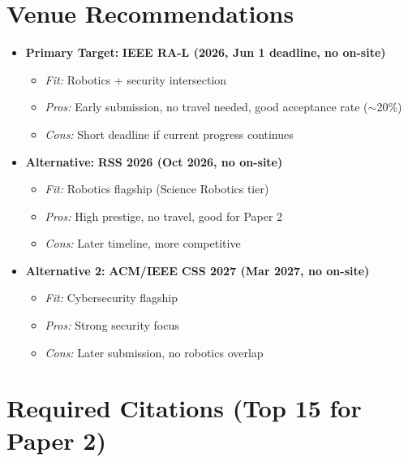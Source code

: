 \documentclass[conference]{IEEEtran}
\begin{document}
\section{Venue Recommendations}

\begin{itemize}
    \item \textbf{Primary Target:} \textbf{IEEE RA-L (2026, Jun 1 deadline, no on-site)}
    \begin{itemize}
        \item \textit{Fit:} Robotics + security intersection
        \item \textit{Pros:} Early submission, no travel needed, good acceptance rate ($\sim$20\%)
        \item \textit{Cons:} Short deadline if current progress continues
    \end{itemize}
    
    \item \textbf{Alternative:} \textbf{RSS 2026 (Oct 2026, no on-site)}
    \begin{itemize}
        \item \textit{Fit:} Robotics flagship (Science Robotics tier)
        \item \textit{Pros:} High prestige, no travel, good for Paper 2
        \item \textit{Cons:} Later timeline, more competitive
    \end{itemize}
    
    \item \textbf{Alternative 2:} \textbf{ACM/IEEE CSS 2027 (Mar 2027, no on-site)}
    \begin{itemize}
        \item \textit{Fit:} Cybersecurity flagship
        \item \textit{Pros:} Strong security focus
        \item \textit{Cons:} Later submission, no robotics overlap
    \end{itemize}
\end{itemize}

\section{Required Citations (Top 15 for Paper 2)}
\end{document}
